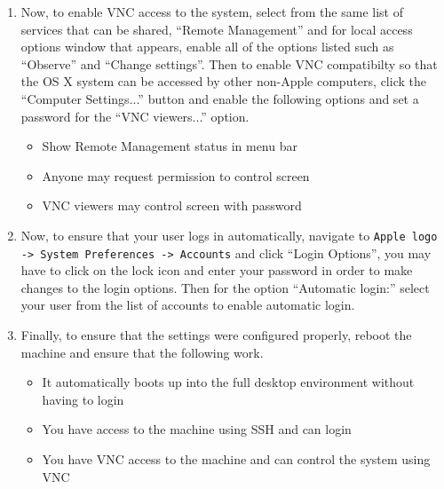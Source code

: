 \begin{enumerate}
\item	Now, to enable VNC access to the system, select from the same list of services that can be shared, ``Remote Management'' and
		for local access options window that appears, enable all of the options listed such as ``Observe'' and ``Change settings''.
		Then to enable VNC compatibilty so that the OS X system can be accessed by other non-Apple computers, click the ``Computer
		Settings...'' button and enable the following options and set a password for the ``VNC viewers...'' option.
\begin{itemize}
\item	Show Remote Management status in menu bar
\item	Anyone may request permission to control screen
\item	VNC viewers may control screen with password
\end{itemize}

\item	Now, to ensure that your user logs in automatically, navigate to \verb|Apple logo -> System Preferences -> Accounts| and click
		``Login Options'', you may have to click on the lock icon and enter your password in order to make changes to the login options. 
		Then for the option ``Automatic login:'' select your user from the list of accounts to enable automatic login.
		
\item 	Finally, to ensure that the settings were configured properly, reboot the machine and ensure that the following work.
\begin{itemize}
\item	It automatically boots up into the full desktop environment without having to login
\item	You have access to the machine using SSH and can login
\item	You have VNC access to the machine and can control the system using VNC	
\end{itemize}
\end{enumerate}




